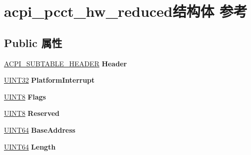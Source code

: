 \hypertarget{structacpi__pcct__hw__reduced}{}\section{acpi\+\_\+pcct\+\_\+hw\+\_\+reduced结构体 参考}
\label{structacpi__pcct__hw__reduced}
\subsection*{Public 属性}
\begin{DoxyCompactItemize}
\item 
\mbox{\label{structacpi__pcct__hw__reduced_a34d92b45b33d62e9e0e0308a48f73960}} 
\hyperlink{structacpi__subtable__header}{A\+C\+P\+I\+\_\+\+S\+U\+B\+T\+A\+B\+L\+E\+\_\+\+H\+E\+A\+D\+ER} {\bfseries Header}
\item 
\mbox{\label{structacpi__pcct__hw__reduced_ad51ebb5894187dc672a3431f6a5817ac}} 
\hyperlink{_processor_bind_8h_ae1e6edbbc26d6fbc71a90190d0266018}{U\+I\+N\+T32} {\bfseries Platform\+Interrupt}
\item 
\mbox{\label{structacpi__pcct__hw__reduced_af2552434a53a778f41e51487b8cd2429}} 
\hyperlink{_processor_bind_8h_ab27e9918b538ce9d8ca692479b375b6a}{U\+I\+N\+T8} {\bfseries Flags}
\item 
\mbox{\label{structacpi__pcct__hw__reduced_a82d089efde0f1fcb5ef1f263ea4f30a3}} 
\hyperlink{_processor_bind_8h_ab27e9918b538ce9d8ca692479b375b6a}{U\+I\+N\+T8} {\bfseries Reserved}
\item 
\mbox{\label{structacpi__pcct__hw__reduced_a100ea5f68aaf6e74a0b5326c9be36533}} 
\hyperlink{_processor_bind_8h_a57be03562867144161c1bfee95ca8f7c}{U\+I\+N\+T64} {\bfseries Base\+Address}
\item 
\mbox{\label{structacpi__pcct__hw__reduced_a06f0c0406f9f163db2531cad6721de20}} 
\hyperlink{_processor_bind_8h_a57be03562867144161c1bfee95ca8f7c}{U\+I\+N\+T64} {\bfseries Length}
\item 
\mbox{\label{structacpi__pcct__hw__reduced_a51636e3aa04705e0e955382b4735315c}} 

\end{DoxyCompactItemize}
